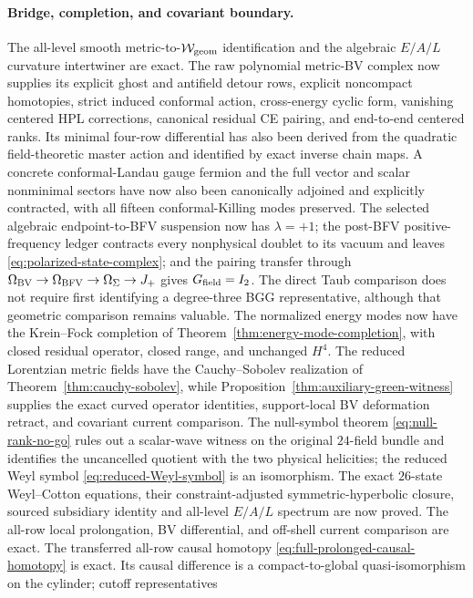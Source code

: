 \documentclass[11pt]{article}
\theoremstyle{definition}
\theoremstyle{remark}
\begin{document}
\paragraph{Bridge, completion, and covariant boundary.}
The all-level smooth metric-to-$\mathcal W_{\rm geom}$ identification and
the algebraic $E/A/L$ curvature intertwiner are exact.  The raw polynomial
metric-BV complex now supplies its explicit ghost and antifield detour rows,
explicit
noncompact homotopies, strict induced conformal action, cross-energy cyclic
form, vanishing centered HPL corrections, canonical residual CE pairing,
and end-to-end centered ranks.  Its minimal four-row differential has also
been derived from the quadratic field-theoretic master action and identified
by exact inverse chain maps.  A concrete conformal-Landau gauge fermion and
the full vector and scalar nonminimal sectors have now also been canonically
adjoined and explicitly contracted, with all fifteen conformal-Killing modes
preserved.  The selected algebraic endpoint-to-BFV suspension now has
$\lambda=+1$; the post-BFV positive-frequency ledger contracts every
nonphysical doublet to its vacuum and leaves
\eqref{eq:polarized-state-complex}; and the pairing transfer through
$\Omega_{\rm BV}\to\Omega_{\rm BFV}\to\Omega_\Sigma\to J_+$ gives
$G_{\rm field}=I_2$.
The direct Taub comparison does not require first identifying a
degree-three BGG representative, although that geometric comparison remains
valuable.  The normalized energy modes now have the Krein--Fock completion
of Theorem~\ref{thm:energy-mode-completion}, with closed residual operator,
closed range, and unchanged $H^4$.  The reduced Lorentzian metric fields
have the Cauchy--Sobolev realization of
Theorem~\ref{thm:cauchy-sobolev}, while
Proposition~\ref{thm:auxiliary-green-witness} supplies the exact curved
operator identities, support-local BV deformation retract, and covariant
current comparison.  The null-symbol theorem
\eqref{eq:null-rank-no-go} rules out a scalar-wave witness on the original
$24$-field bundle and identifies the uncancelled quotient with the two
physical helicities; the reduced Weyl symbol \eqref{eq:reduced-Weyl-symbol}
is an isomorphism.  The exact $26$-state Weyl--Cotton equations, their
constraint-adjusted symmetric-hyperbolic closure, sourced subsidiary
identity and all-level $E/A/L$ spectrum are now proved.  The all-row local
prolongation, BV differential, and off-shell current comparison are exact.
The transferred all-row causal homotopy
\eqref{eq:full-prolonged-causal-homotopy} is exact.  Its causal difference is
a compact-to-global quasi-isomorphism on the cylinder; cutoff representatives
\end{document}
